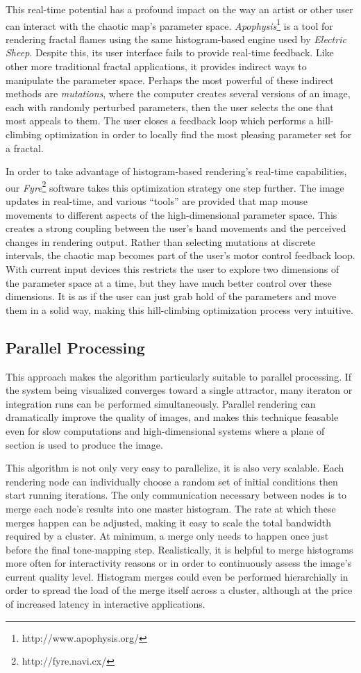 \documentclass[letterpaper, 12pt]{article}
\begin{document}
This real-time potential has a profound impact on the way an artist or other user can
interact with the chaotic map's parameter space. \emph{Apophysis}\footnote{http://www.apophysis.org/}
is a tool for rendering fractal flames using the same histogram-based engine used by \emph{Electric Sheep}.
Despite this, its user interface fails to provide real-time feedback. Like other more traditional
fractal applications, it provides indirect ways to manipulate the parameter space. Perhaps the most
powerful of these indirect methods are \emph{mutations}, where the computer creates several versions
of an image, each with randomly perturbed parameters, then the user selects the one that most appeals
to them. The user closes a feedback loop which performs a hill-climbing optimization in order
to locally find the most pleasing parameter set for a fractal.

In order to take advantage of histogram-based rendering's real-time capabilities, our
\emph{Fyre}\footnote{http://fyre.navi.cx/} software takes this optimization strategy one step
further. The image updates in real-time, and various ``tools'' are provided that map mouse movements
to different aspects of the high-dimensional parameter space. This creates a strong coupling
between the user's hand movements and the perceived changes in rendering output. Rather than
selecting mutations at discrete intervals, the chaotic map becomes part of the user's motor control
feedback loop. With current input devices this restricts the user to explore two dimensions of the
parameter space at a time, but they have much better control over these dimensions. It is as if the
user can just grab hold of the parameters and move them in a solid way, making this hill-climbing
optimization process very intuitive.

\subsection{Parallel Processing}
This approach makes the algorithm particularly suitable to parallel processing.  If the
system being visualized converges toward a single attractor, many iteraton or integration
runs can be performed simultaneously.
Parallel rendering can dramatically improve the quality of images, and makes
this technique feasable even for slow computations and high-dimensional systems where a
plane of section is used to produce the image.

This algorithm is not only very easy to parallelize, it is
also very scalable. Each rendering node can individually choose a random
set of initial conditions then start running iterations. The only communication necessary between
nodes is to merge each node's results into one master histogram. The rate at which these merges
happen can be adjusted, making it easy to scale the total bandwidth required by a cluster.
At minimum, a merge only needs to happen once just before the final tone-mapping
step. Realistically, it is helpful to merge histograms more often for interactivity reasons
or in order to continuously assess the image's current quality level. Histogram merges could even
be performed hierarchially in order to spread the load of the merge itself across a cluster, although
at the price of increased latency in interactive applications.
\end{document}
